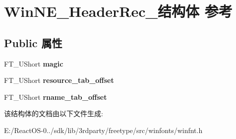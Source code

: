 \hypertarget{struct_win_n_e___header_rec__}{}\section{Win\+N\+E\+\_\+\+Header\+Rec\+\_\+结构体 参考}
\label{struct_win_n_e___header_rec__}
\subsection*{Public 属性}
\begin{DoxyCompactItemize}
\item 
\mbox{\label{struct_win_n_e___header_rec___af6f7f374643d72a3de09a576c627dca5}} 
F\+T\+\_\+\+U\+Short {\bfseries magic}
\item 
\mbox{\label{struct_win_n_e___header_rec___ace0518b40900890d400eb6c068ed6651}} 
F\+T\+\_\+\+U\+Short {\bfseries resource\+\_\+tab\+\_\+offset}
\item 
\mbox{\label{struct_win_n_e___header_rec___a6fadce114f8a08aa7c5cc913c99e003a}} 
F\+T\+\_\+\+U\+Short {\bfseries rname\+\_\+tab\+\_\+offset}
\end{DoxyCompactItemize}


该结构体的文档由以下文件生成\+:\begin{DoxyCompactItemize}
\item 
E\+:/\+React\+O\+S-\/0../sdk/lib/3rdparty/freetype/src/winfonts/winfnt.\+h\end{DoxyCompactItemize}
